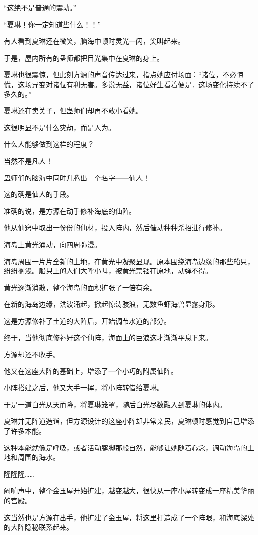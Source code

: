 \begin{this_body}
“这绝不是普通的震动。”

“夏琳！你一定知道些什么！！”

有人看到夏琳还在微笑，脑海中顿时灵光一闪，尖叫起来。

于是，屋内所有的蛊师都把目光集中在夏琳的身上。

夏琳也很震惊，但此刻方源的声音传达过来，指点她应付场面：“诸位，不必惊慌，这场异变对诸位有利无害。多说无益，诸位好生看着便是，这场变化持续不了多久的。”

夏琳还在卖关子，但蛊师们却再不敢小看她。

这很明显不是什么灾劫，而是人为。

什么人能够做到这样的程度？

当然不是凡人！

蛊师们的脑海中同时升腾出一个名字——仙人！

这的确是仙人的手段。

准确的说，是方源在动手修补海底的仙阵。

他从仙窍中取出一份份的仙材，投入阵内，然后催动种种杀招进行修补。

海岛上黄光涌动，向四周弥漫。

海岛周围一片片全新的土地，在黄光中凝聚显现。原本围绕海岛边缘的那些船只，纷纷搁浅。船只上的人们大呼小叫，被黄光禁锢在原地，动弹不得。

黄光逐渐消散，整个海岛的面积扩张了一倍有余。

在新的海岛边缘，洪波涌起，掀起惊涛骇浪，无数鱼虾海兽显露身形。

这是方源修补了土道的大阵后，开始调节水道的部分。

终于，当他彻底修补好这个仙阵，海面上的巨浪这才渐渐平息下来。

方源却还不收手。

他又在这座大阵的基础上，增添了一个小巧的附属仙阵。

小阵搭建之后，他又大手一挥，将小阵转借给夏琳。

于是一道白光从天而降，将夏琳笼罩，随后白光尽数融入到夏琳的体内。

夏琳并无阵道造诣，但方源设计的这座小阵却非常亲民，夏琳顿时感觉到自己增添了许多本能。

这种本能就像是呼吸，或者活动腿脚那般自然，能够让她随着心念，调动海岛的土地和周围的海水。

隆隆隆……

闷响声中，整个金玉屋开始扩建，越变越大，很快从一座小屋转变成一座精美华丽的宫殿。

这当然也是方源在出手，他扩建了金玉屋，将这里打造成了一个阵眼，和海底深处的大阵隐秘联系起来。


\end{this_body}
